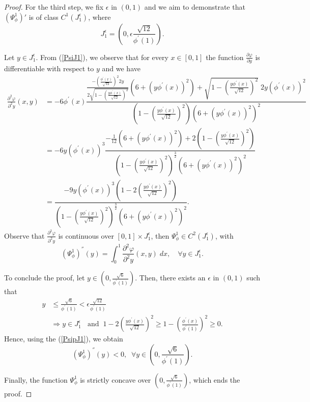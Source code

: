 \documentclass[10pt,a4paper]{amsart}
\begin{document}
\begin{proof}
For the third step, we fix $\epsilon$  in $(0,1)$ and we aim to demonstrate  that $\left(\Psi_{\phi}^{1}\right)'$ is of class $C^{1}\left(J_1^{\epsilon}\right)$, where $$J_1^{\epsilon}=\left(0,\epsilon\frac{\sqrt{12}}{\phi^{'}(1)}  \right).$$

Let $y\in J_1^{\epsilon}$. From (\ref{PsiJ1}), we observe that for every $x\in [0,1]$ the function $\frac{\partial\varphi}{\partial y}$ is differentiable with respect to $y$ and we have 
\begin{align*}
    \frac{\partial^2\varphi}{\partial^2 y}(x,y)&=-6\phi^{'}(x)\dfrac{\frac{-\left(\frac{\phi^{'}(x)}{\sqrt{12}}\right)^2 2y}{2\sqrt{1-\left(\frac{y\phi^{'}(x)}{\sqrt{12}}\right)^2}}\left(6+\left(y\phi^{'}(x)\right)^2\right)+\sqrt{1-\left(\frac{y\phi^{'}(x)}{\sqrt{12}}\right)^2}\;2y\left(\phi^{'}(x)\right)^2}{\left(1-\left(\frac{y\phi^{'}(x)}{\sqrt{12}}\right)^2\right)\left(6+\left(y\phi^{'}(x)\right)^2\right)^2}\\
    &=-6y\left(\phi^{'}(x)\right)^3\dfrac{-\frac{1}{12}\left(6+\left(y\phi^{'}(x)\right)^2\right)+2\left(1-\left(\frac{y\phi^{'}(x)}{\sqrt{12}}\right)^2\right)}{\left(1-\left(\frac{y\phi^{'}(x)}{\sqrt{12}}\right)^2\right)^{\frac{3}{2}}\left(6+\left(y\phi^{'}(x)\right)^2\right)^2}\\
    &=\dfrac{-9y\left(\phi^{'}(x)\right)^3 \left(1-2\left(\frac{y\phi^{'}(x)}{\sqrt{12}}\right)^2\right)}{\left(1-\left(\frac{y\phi^{'}(x)}{\sqrt{12}}\right)^2\right)^{\frac{3}{2}}\left(6+\left(y\phi^{'}(x)\right)^2\right)^2}.
\end{align*}
Observe that $\frac{\partial^2\varphi}{\partial^2 y}$ is continuous over $[0,1]\times J_1^{\epsilon} $, then  $\Psi_{\phi}^{1}\in C^2(J_1^{\epsilon})$, with
\begin{equation}\label{PsipJ1}
\left(\Psi_{\phi}^{1}\right)^{''}(y)=\displaystyle\int_0^1 \dfrac{\partial^2 \varphi}{\partial^2 y}(x,y)\;dx,\quad\forall y\in J_1^{\epsilon}.
\end{equation}

To conclude the proof, let $y\in \left(0,\frac{\sqrt{6}}{\phi^{'}(1)}\right)$. Then, there exists an $\epsilon$ in $(0,1)$ such that 
\begin{align*}
    y&\leq \frac{\sqrt{6}}{\phi^{'}(1)}< \epsilon\frac{\sqrt{12}}{\phi^{'}(1)}\\
    &\Rightarrow y\in J_1^{\epsilon}\;\;\text{ and}\;\; 1-2\left(\frac{y\phi^{'}(x)}{\sqrt{12}}\right)^2\geq 1-\left(\frac{\phi^{'}(x)}{\phi^{'}(1)}\right)^2\geq 0.
\end{align*}
Hence, using the (\ref{PsipJ1}), we obtain 
$$\left(\Psi_{\phi}^{1}\right)^{''}(y)<0,\;\;\forall y\in \left(0,\frac{\sqrt{6}}{\phi^{'}(1)}\right). $$

Finally, the function $\Psi_{\phi}^{1}$ is strictly concave over $\left(0,\frac{\sqrt{6}}{\phi^{'}(1)}\right)$, which ends the proof.
\end{proof}
\end{document}
